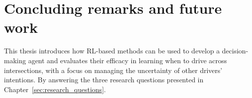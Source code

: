\chapter{Concluding remarks and future work}
\label{ch:conclusion_fw}

This thesis introduces how RL-based methods can be used to develop a decision-making agent and evaluates their efficacy in learning when to drive across intersections, with a focus on managing the uncertainty of other drivers' intentions. 
By answering the three research questions presented in Chapter~\ref{sec:research_questions}.

